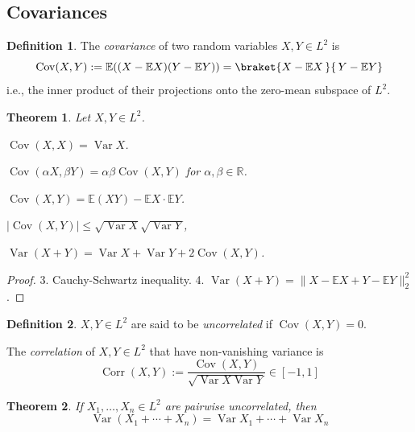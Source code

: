 \documentclass[11pt, a4paper, openany]{book}
\newtheorem{thm}{Theorem}\newtheorem{lem}{Lemma}\newtheorem{crl}{Corollary}
\theoremstyle{definition}
\newtheorem{define}{Definition}\newtheorem{exam}{Example}\newtheorem{remark}{Remark}
\DeclareMathOperator{\Corr}{Corr}
\DeclareMathOperator{\Var}{Var}
\DeclareMathOperator{\Cov}{Cov}
\newenvironment{tight_enumerate}{\begin{enumerate}\itemsep -0.2em}{\end{enumerate}}
\begin{document}
\subsection{Covariances}
    \begin{define}
        The \textit{covariance} of two random variables $X,Y\in L^2$ is
        \[
            \Cov(X,Y):=\mathbb{E}((X-\mathbb{E}X)(Y-\mathbb{E}Y))=\braket{X-\mathbb{E}X\,}{\,Y-\mathbb{E}Y}
        \]
        i.e., the inner product of their projections onto the zero-mean subspace of $L^2$.
    \end{define}
    \begin{thm}\label{properties_of_covariance}
        Let $X,Y\in L^2$.
        \begin{tight_enumerate}
            \item $\Cov(X,X)=\Var X$.
            \item $\Cov(\alpha X,\beta Y)=\alpha\beta\Cov(X,Y)$ for $\alpha,\beta\in\mathbb{R}$.
            \item $\Cov(X,Y)=\mathbb{E}(XY)-\mathbb{E}X\cdot \mathbb{E}Y$.
            \item $|\Cov(X,Y)|\leqslant \sqrt{\Var X}\sqrt{\Var Y}$,
            \item $\Var(X+Y)=\Var X+\Var Y+2\Cov(X,Y)$.
        \end{tight_enumerate}
    \end{thm}
    \begin{proof}
        3. Cauchy-Schwartz inequality. 4. $\Var(X+Y)=\|X-\mathbb{E}X+Y-\mathbb{E}Y\|_2^2$.
    \end{proof}
    \begin{define}
        $X,Y\in L^2$ are said to be \textit{uncorrelated} if $\Cov(X,Y)=0$.

        The \textit{correlation} of $X,Y\in L^2$ that have non-vanishing variance is
        \[
            \Corr(X,Y):=\frac{\Cov(X,Y)}{\sqrt{\Var{X}\Var{Y}}}\in [-1,1]
        \]
    \end{define}
    \begin{thm}
        If $X_1,\dots,X_n\in L^2$ are pairwise uncorrelated, then
        \[
            \Var(X_1+\cdots+X_n)=\Var X_1+\cdots+\Var X_n
        \]
    \end{thm}
\end{document}
